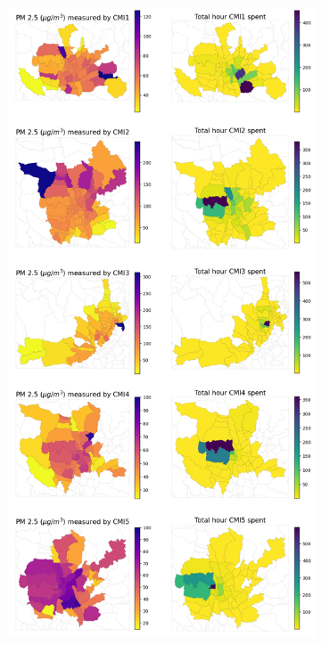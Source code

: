 \begin{figure}[t]
\begin{subfigure}[t]{0.49\textwidth}
        \includegraphics[width=\linewidth]{figures/map/CMI_PM_TIME.png}%

\end{subfigure}
\end{figure}
